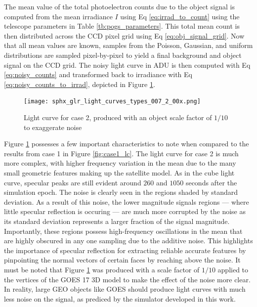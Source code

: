 The mean value of the total photoelectron counts due to the object signal is computed from the mean irradiance $I$ using Eq \ref{eq:irrad_to_count} using the telescope parameters in Table \ref{tb:pogs_parameters}. This total mean count is then distributed across the CCD pixel grid using Eq \ref{eq:obj_signal_grid}. Now that all mean values are known, samples from the Poisson, Gaussian, and uniform distributions are sampled pixel-by-pixel to yield a final background and object signal on the CCD grid. The noisy light curve in ADU is then computed with Eq \ref{eq:noisy_counts} and transformed back to irradiance with Eq \ref{eq:noisy_counts_to_irrad}, depicted in Figure \ref{fig:case2_lc}.

\begin{figure}[!htb]
  \centering
  \texttt{[image: sphx\_glr\_light\_curves\_types\_007\_2\_00x.png]}
  \caption{Light curve for case 2, produced with an object scale factor of $1/10$ to exaggerate noise}
  \label{fig:case2_lc}
\end{figure}

Figure \ref{fig:case2_lc} possesses a few important characteristics to note when compared to the results from case 1 in Figure \ref{fig:case1_lc}. The light curve for case 2 is much more complex, with higher frequency variation in the mean due to the many small geometric features making up the satellite model. As in the cube light curve, specular peaks are still evident around $260$ and $1050$ seconds after the simulation epoch. The noise is clearly seen in the regions shaded by standard deviation. As a result of this noise, the lower magnitude signals regions --- where little specular reflection is occuring --- are much more corrupted by the noise as its standard deviation represents a larger fraction of the signal magnitude. Importantly, these regions possess high-frequency oscillations in the mean that are highly obscured in any one sampling due to the additive noise. This highlights the importance of specular reflection for extracting reliable accurate features by pinpointing the normal vectors of certain faces by reaching above the noise. It must be noted that Figure \ref{fig:case2_lc} was produced with a scale factor of $1/10$ applied to the vertices of the GOES 17 3D model to make the effect of the noise more clear. In reality, large GEO objects like GOES should produce light curves with much less noise on the signal, as prediced by the simulator developed in this work. 